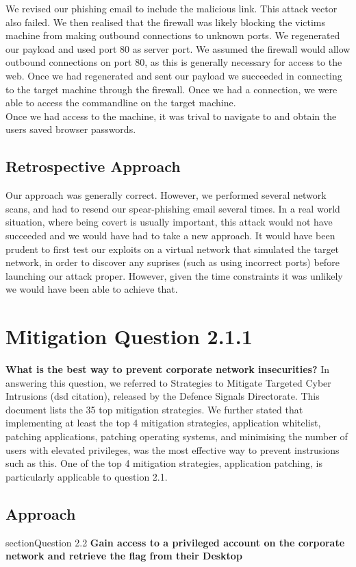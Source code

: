 We revised our phishing email to include the malicious link. This attack vector also failed. We then realised that the firewall was likely blocking the victims machine from making outbound connections to unknown ports. We regenerated our payload and used port 80 as server port. We assumed the firewall would allow outbound connections on port 80, as this is generally necessary for access to the web. Once we had regenerated and sent our payload we succeeded in connecting to the target machine through the firewall. Once we had a connection, we were able to access the commandline on the target machine.\\
Once we had access to the machine, it was trival to navigate to and obtain the users saved browser passwords.
\subsection{Retrospective Approach}
Our approach was generally correct. However, we performed several network scans, and had to resend our spear-phishing email several times. In a real world situation, where being covert is usually important, this attack would not have succeeded and we would have had to take a new approach. It would have been prudent to first test our exploits on a virtual network that simulated the target network, in order to discover any suprises (such as using incorrect ports) before launching our attack proper. However, given the time constraints it was unlikely we would have been able to achieve that. 
\section{Mitigation Question 2.1.1}
\textbf{What is the best way to prevent corporate network insecurities?}
In answering this question, we referred to Strategies to Mitigate Targeted Cyber Intrusions (dsd citation), released by the Defence Signals Directorate. This document lists the 35 top mitigation strategies. We further stated that implementing at least the top 4 mitigation strategies, application whitelist, patching applications, patching operating systems, and minimising the number of users with elevated privileges, was the most effective way to prevent instrusions such as this. One of the top 4 mitigation strategies, application patching, is particularly applicable to question 2.1. 
\subsection{Approach}
section{Question 2.2}
\textbf{Gain access to a privileged account on the corporate network and
retrieve the flag from their Desktop}
